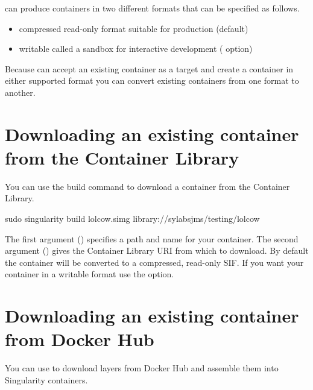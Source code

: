 \documentclass[letterpaper,10pt,english]{sphinxmanual}
\begin{document}
 can produce containers in two different formats that can be specified
as follows.
\begin{itemize}
\item {} 
compressed read-only  format suitable for
production (default)

\item {} 
writable  called a sandbox for interactive development
(  option)

\end{itemize}

Because  can accept an existing container as a target and create a
container in either supported format you can convert existing containers from
one format to another.


\section{Downloading an existing container from the Container Library}
\label{\detokenize{build_a_container:downloading-an-existing-container-from-the-container-library}}
You can use the build command to download a container from the Container
Library.

%
\begin{sphinxVerbatim}[commandchars=\\\{\}]
\PYGZdl{} sudo singularity build lolcow.simg library://sylabs\PYGZhy{}jms/testing/lolcow
\end{sphinxVerbatim}

The first argument () specifies a path and name for your
container. The second argument () gives
the Container Library URI from which to download. By default the container will
be converted to a compressed, read-only SIF. If you want your container in a
writable format use the  option.


\section{Downloading an existing container from Docker Hub}
\label{\detokenize{build_a_container:downloading-an-existing-container-from-docker-hub}}
You can use  to download layers from Docker Hub and assemble them into
Singularity containers.
\end{document}
